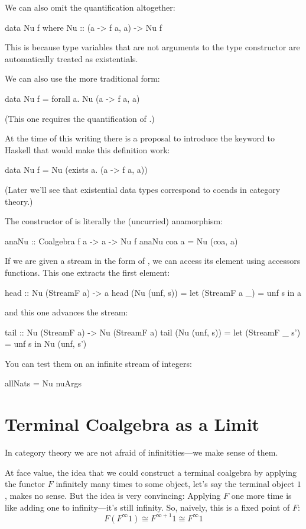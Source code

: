 \documentclass[DaoFP]{subfiles}
\begin{document}
We can also omit the quantification altogether:
\begin{haskell}
data Nu f where 
  Nu :: (a -> f a, a) -> Nu f
\end{haskell}
This is because type variables that are not arguments to the type constructor are automatically treated as existentials. 

We can also use the more traditional form:
\begin{haskell}
data Nu f = forall a. Nu (a -> f a, a)
\end{haskell}
(This one requires the quantification of .)

At the time of this writing there is a proposal to introduce the keyword  to Haskell that would make this definition work:
\begin{haskell}
data Nu f = Nu (exists a. (a -> f a, a))
\end{haskell}
(Later we'll see that existential data types correspond to coends in category theory.)

The constructor of  is literally the (uncurried) anamorphism:
\begin{haskell}
anaNu :: Coalgebra f a -> a -> Nu f
anaNu coa a = Nu (coa, a)
\end{haskell}

If we are given a stream in the form of , we can access its element using accessors functions. This one extracts the first element:
\begin{haskell}
head :: Nu (StreamF a) -> a
head (Nu (unf, s)) = 
  let (StreamF a _) = unf s 
  in a
\end{haskell}
and this one advances the stream:
\begin{haskell}
tail :: Nu (StreamF a) -> Nu (StreamF a)
tail (Nu (unf, s)) = 
  let (StreamF _ s') = unf s 
  in Nu (unf, s')
\end{haskell}
You can test them on an infinite stream of integers:
\begin{haskell}
allNats = Nu nuArgs
\end{haskell}

\section{Terminal Coalgebra as a Limit}

In category theory we are not afraid of infinitities---we make sense of them. 

At face value, the idea that we could construct a terminal coalgebra by applying the functor $F$ infinitely many times to some object, let's say the terminal object $1$, makes no sense. But the idea is very convincing: Applying $F$ one more time is like adding one to infinity---it's still infinity. So, naively, this is a fixed point of $F$:
\[ F (F^{\infty} 1) \cong F^{\infty + 1} 1 \cong F^{\infty} 1\]
\end{document}
